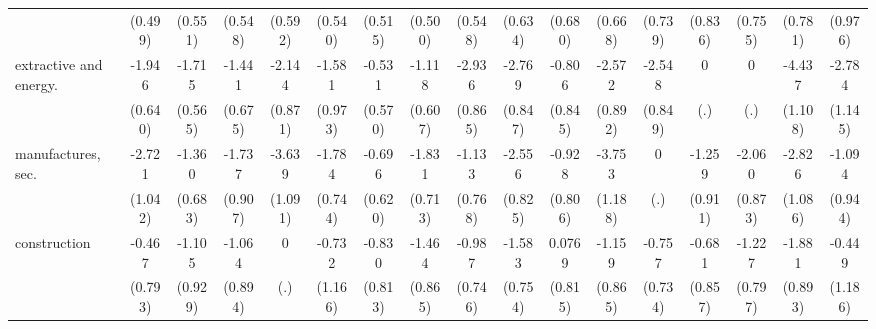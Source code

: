 {\begin{tabular}{l*{16}{c}}
                    &     (0.499)         &     (0.551)         &     (0.548)         &     (0.592)         &     (0.540)         &     (0.515)         &     (0.500)         &     (0.548)         &     (0.634)         &     (0.680)         &     (0.668)         &     (0.739)         &     (0.836)         &     (0.755)         &     (0.781)         &     (0.976)         \\
[1em]
extractive and energy.&      -1.946\sym{**} &      -1.715\sym{**} &      -1.441\sym{*}  &      -2.144\sym{*}  &      -1.581         &      -0.531         &      -1.118         &      -2.936\sym{***}&      -2.769\sym{**} &      -0.806         &      -2.572\sym{**} &      -2.548\sym{**} &           0         &           0         &      -4.437\sym{***}&      -2.784\sym{*}  \\
                    &     (0.640)         &     (0.565)         &     (0.675)         &     (0.871)         &     (0.973)         &     (0.570)         &     (0.607)         &     (0.865)         &     (0.847)         &     (0.845)         &     (0.892)         &     (0.849)         &         (.)         &         (.)         &     (1.108)         &     (1.145)         \\
[1em]
manufactures, sec.  &      -2.721\sym{**} &      -1.360\sym{*}  &      -1.737         &      -3.639\sym{***}&      -1.784\sym{*}  &      -0.696         &      -1.831\sym{*}  &      -1.133         &      -2.556\sym{**} &      -0.928         &      -3.753\sym{**} &           0         &      -1.259         &      -2.060\sym{*}  &      -2.826\sym{**} &      -1.094         \\
                    &     (1.042)         &     (0.683)         &     (0.907)         &     (1.091)         &     (0.744)         &     (0.620)         &     (0.713)         &     (0.768)         &     (0.825)         &     (0.806)         &     (1.188)         &         (.)         &     (0.911)         &     (0.873)         &     (1.086)         &     (0.944)         \\
[1em]
construction        &      -0.467         &      -1.105         &      -1.064         &           0         &      -0.732         &      -0.830         &      -1.464         &      -0.987         &      -1.583\sym{*}  &      0.0769         &      -1.159         &      -0.757         &      -0.681         &      -1.227         &      -1.881\sym{*}  &      -0.449         \\
                    &     (0.793)         &     (0.929)         &     (0.894)         &         (.)         &     (1.166)         &     (0.813)         &     (0.865)         &     (0.746)         &     (0.754)         &     (0.815)         &     (0.865)         &     (0.734)         &     (0.857)         &     (0.797)         &     (0.893)         &     (1.186)         \\

\end{tabular}}
